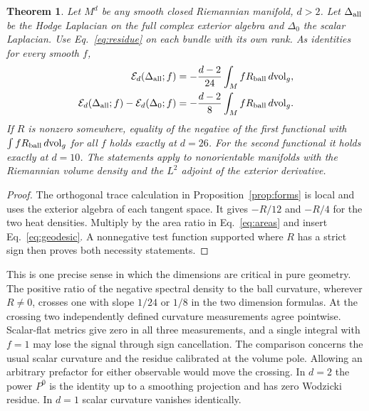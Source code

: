 \documentclass[aps,prd,reprint,onecolumn,nofootinbib,amsmath,amssymb]{revtex4-2}
\newtheorem{theorem}{Theorem}
\newcommand{\dv}{\,d\mathrm{vol}_g}
\begin{document}
\begin{theorem}\label{thm:geometric}
Let \(M^d\) be any smooth closed Riemannian manifold, \(d>2\).
Let \(\Delta_{\rm all}\) be the Hodge Laplacian on the full complex
exterior algebra and \(\Delta_0\) the scalar Laplacian. Use
Eq.~\eqref{eq:residue} on each bundle with its own rank. As identities
for every smooth \(f\),
\begin{equation}
 \begin{aligned}
 \mathcal E_d(\Delta_{\rm all};f)
    &=-\frac{d-2}{24}\int_M fR_{\rm ball}\dv ,\\
 \mathcal E_d(\Delta_{\rm all};f)-\mathcal E_d(\Delta_0;f)
    &=-\frac{d-2}{8}\int_M fR_{\rm ball}\dv .
 \end{aligned}
 \label{eq:ballidentities}
\end{equation}
If \(R\) is nonzero somewhere, equality of the negative of the first
functional with \(\int fR_{\rm ball}\dv\) for all \(f\) holds exactly at
\(d=26\). For the second functional it holds exactly at \(d=10\).
The statements apply to nonorientable manifolds with the Riemannian
volume density and the \(L^2\) adjoint of the exterior derivative.
\end{theorem}
\begin{proof}
The orthogonal trace calculation in Proposition~\ref{prop:forms} is local
and uses the exterior algebra of each tangent space. It gives \(-R/12\)
and \(-R/4\) for the two heat densities. Multiply by the area ratio in
Eq.~\eqref{eq:areas} and insert Eq.~\eqref{eq:geodesic}. A nonnegative
test function supported where \(R\) has a strict sign then proves both
necessity statements.
\end{proof}

This is one precise sense in which the dimensions are critical in pure
geometry. The positive ratio of the negative spectral density to the
ball curvature, wherever \(R\ne0\), crosses one with slope \(1/24\)
or \(1/8\) in the two dimension formulas. At the crossing two independently
defined curvature measurements agree pointwise. Scalar-flat metrics give
zero in all three measurements, and a single integral with \(f=1\) may
lose the signal through sign cancellation. The comparison concerns the
usual scalar curvature and the residue calibrated at the volume pole.
Allowing an arbitrary prefactor for either observable would move the
crossing. In \(d=2\) the power \(P^0\) is the identity up to a smoothing
projection and has zero Wodzicki residue. In \(d=1\) scalar curvature
vanishes identically.
\end{document}
